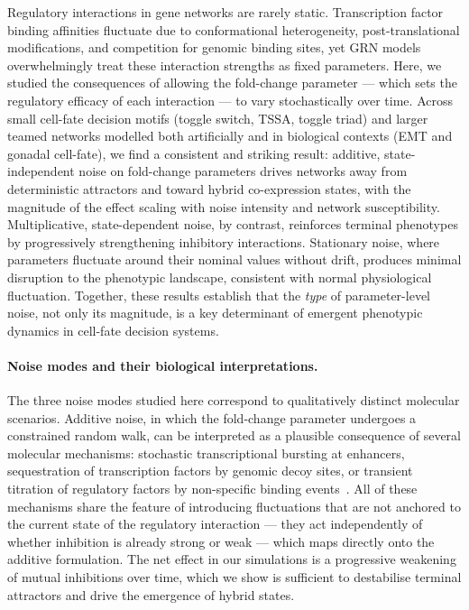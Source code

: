 \documentclass[11pt]{article}
\begin{document}
Regulatory interactions in gene networks are rarely static. Transcription factor binding affinities fluctuate due to conformational heterogeneity, post-translational modifications, and competition for genomic binding sites, yet GRN models overwhelmingly treat these interaction strengths as fixed parameters. Here, we studied the consequences of allowing the fold-change parameter --- which sets the regulatory efficacy of each interaction --- to vary stochastically over time. Across small cell-fate decision motifs (toggle switch, TSSA, toggle triad) and larger teamed networks modelled both artificially and in biological contexts (EMT and gonadal cell-fate), we find a consistent and striking result: additive, state-independent noise on fold-change parameters drives networks away from deterministic attractors and toward hybrid co-expression states, with the magnitude of the effect scaling with noise intensity and network susceptibility. Multiplicative, state-dependent noise, by contrast, reinforces terminal phenotypes by progressively strengthening inhibitory interactions. Stationary noise, where parameters fluctuate around their nominal values without drift, produces minimal disruption to the phenotypic landscape, consistent with normal physiological fluctuation. Together, these results establish that the \textit{type} of parameter-level noise, not only its magnitude, is a key determinant of emergent phenotypic dynamics in cell-fate decision systems.

\paragraph{Noise modes and their biological interpretations.}
The three noise modes studied here correspond to qualitatively distinct molecular scenarios. Additive noise, in which the fold-change parameter undergoes a constrained random walk, can be interpreted as a plausible consequence of several molecular mechanisms: stochastic transcriptional bursting at enhancers, sequestration of transcription factors by genomic decoy sites, or transient titration of regulatory factors by non-specific binding events~\cite{Dey2020EnhancementSites, Raj2006StochasticCells}. All of these mechanisms share the feature of introducing fluctuations that are not anchored to the current state of the regulatory interaction --- they act independently of whether inhibition is already strong or weak --- which maps directly onto the additive formulation. The net effect in our simulations is a progressive weakening of mutual inhibitions over time, which we show is sufficient to destabilise terminal attractors and drive the emergence of hybrid states.
\end{document}
